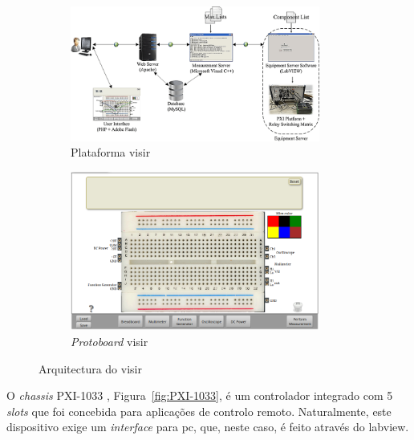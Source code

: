 \begin{figure}[hbtp]
    \centering
    \begin{subfigure}[hbtp]{0.48\textwidth}
        \centering
        \includegraphics[width=0.9\textwidth]{figures/arquitectura_VISIR.png}
        \caption{Plataforma \acrshort{visir} \cite{tawfikexperiences}}
        \label{fig:platvisir}
    \end{subfigure}
    \begin{subfigure}[hbtp]{0.48\textwidth}
        \includegraphics[width=0.9\textwidth]{figures/protboard_visir.png}
        \caption{\textit{Protoboard} \acrshort{visir}}
        \label{fig:protoboadrvisir}
    \end{subfigure}
    \caption{Arquitectura do \acrshort{visir}}
    \label{fig:arquitecturavisir}
\end{figure}

O \textit{chassis} PXI-1033 \cite{PXI-1033}, Figura~\ref{fig:PXI-1033}, é um controlador integrado com 5 \textit{slots} que foi concebida para aplicações de controlo remoto. Naturalmente, este dispositivo exige um \textit{interface} para \acrshort{pc}, que, neste caso, é feito através do \acrshort{labview}.

